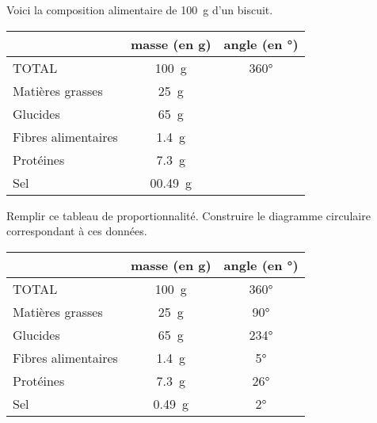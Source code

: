 \documentclass[../Cours.tex]{subfiles}
\begin{document}
\clearpage
\EXERCICES 
\begin{questions}
    \exercice 
    Voici la composition alimentaire de \qty{100}{\gram} d'un biscuit.

    \begin{center}
        \begin{tabularx}{0.6\linewidth}{|l|C|C|}\hline
            & masse (en \unit{\gram}) & angle (en \unit{°}) \\\hline
            TOTAL & \qty{100}{\gram} & \ang{360} \\ \hline \hline 
            Matières grasses & \qty{25}{\gram} & \\\hline
            Glucides & \qty{65}{\gram} & \\\hline
            Fibres alimentaires & \qty{1.4}{\gram} & \\\hline
            Protéines & \qty{7.3}{\gram} & \\\hline
            Sel & \qty{0    .49}{\gram} & \\\hline
        \end{tabularx}
    \end{center}

    \question Remplir ce tableau de proportionnalité.
    \question Construire le diagramme circulaire correspondant à ces données.
\end{questions}

\clearpage
\EXERCICES
\begin{questions}
    \exercice 
    \question 
    \begin{center}
        \begin{tabularx}{0.6\linewidth}{|l|C|C|}\hline
            & masse (en \unit{\gram}) & angle (en \unit{°}) \\\hline
            TOTAL & \qty{100}{\gram} & \ang{360} \\ \hline \hline 
            Matières grasses & \qty{25}{\gram} & \ang{90} \\\hline
            Glucides & \qty{65}{\gram} & \ang{234} \\\hline
            Fibres alimentaires & \qty{1.4}{\gram} & \ang{5}  \\\hline
            Protéines & \qty{7.3}{\gram} & \ang{26} \\\hline
            Sel & \qty{0.49}{\gram} & \ang{2} \\\hline
        \end{tabularx}
    \end{center}
    \question 
    \begin{center}
        \begin{tikzpicture}
            
        \end{tikzpicture}
    \end{center}
\end{questions}
\end{document}
